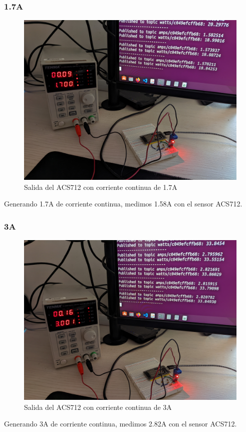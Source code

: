 \begin{titlepage}
\subsubsection{1.7A}
\begin{figure}[h!]
	\centering
	\includegraphics[width=1\textwidth]{imagenes/DC_1_7Amp.jpg}
	\caption{Salida del ACS712 con corriente continua de 1.7A}
\end{figure}
Generando 1.7A de corriente continua, medimos 1.58A con el sensor ACS712. \\
\subsubsection{3A}
\begin{figure}[h!]
	\centering
	\includegraphics[width=1\textwidth]{imagenes/DC_3Amps.jpg}
	\caption{Salida del ACS712 con corriente continua de 3A}
\end{figure}
Generando 3A de corriente continua, medimos 2.82A con el sensor ACS712. \\
\newpage

\end{titlepage}
